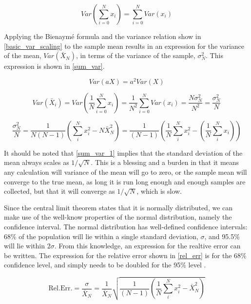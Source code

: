 \begin{equation}
\label{bien}
Var\left(\sum_{i=0}^N x_i \right) = \sum_{i=0}^N Var(x_i)
\end{equation}      


Applying the Bienaym\'e formula and the variance relation show in \eqref{basic_var_scaling} to the sample mean results in an expression for the variance of the mean, $Var(\bar{X}_N)$, in terms of the variance of the sample, $\sigma_N^2$.  This expression is shown in \eqref{sum_var}.  

\begin{equation}
\label{basic_var_scaling}
Var\left(a X \right) = a^2 Var\left( X \right)
\end{equation}

\begin{equation}
\label{sum_var_1}
Var(\bar{X}_i) = Var\left(\frac{1}{N}\sum_{i=0}^N x_i \right) = \frac{1}{N^2} \sum_{i=0}^N Var(x_i) = \frac{N\sigma_N^2}{N^2} =  \frac{\sigma_N^2}{N} 
\end{equation}

\begin{equation}
\label{sum_var}
 \frac{\sigma_N^2}{N} = \frac{1}{N(N-1)} \left( \sum_i^N x_i^2- N\bar{X}_N^2 \right) = \frac{1}{(N-1)} \left( \frac{1}{N} \sum_i^N x_i^2 - \left(   \frac{1}{N} \sum_i^N x_i \right)   \right)
\end{equation}

It should be noted that \eqref{sum_var_1} implies that the standard deviation of the mean always scales as $1/\sqrt{N}$.  This is a blessing and a burden in that it means any calculation will variance of the mean will go to zero, or the sample mean will converge to the true mean, as long it is run long enough and enough samples are collected, but that it will converge as $1/\sqrt{N}$, which is slow.

Since the central limit theorem states that it is normally distributed, we can make use of the well-know properties of the normal distribution, namely the confidence interval.  The normal distribution has well-defined confidence intervals: 68\% of the population will lie within a single standard deviation, $\sigma$, and 95.5\% will lie within $2\sigma$.  From this knowledge, an expression for the realtive error can be written.  The expression for the relative error shown in \eqref{rel_err} is for the 68\% confidence level, and simply needs to be doubled for the 95\% level \cite{MCNP}\cite{jaakko}.

\begin{equation}
\label{rel_err}
\mathrm{Rel. Err.} = \frac{\sigma}{\bar{X}_N} = \frac{1}{\bar{X}_N}\sqrt{\frac{1}{(N-1)} \left( \frac{1}{N}\sum_i^N x_i^2-\bar{X}_N^2 \right)}
\end{equation}


